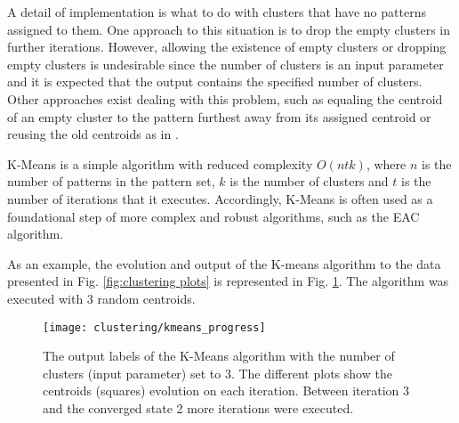 A detail of implementation is what to do with clusters that have no patterns assigned to them.
One approach to this situation is to drop the empty clusters in further iterations.
However, allowing the existence of empty clusters or dropping empty clusters is undesirable since the number of clusters is an input parameter and it is expected that the output contains the specified number of clusters.
Other approaches exist dealing with this problem, such as equaling the centroid of an empty cluster to the pattern furthest away from its assigned centroid or reusing the old centroids as in \cite{Pakhira2009}.

K-Means is a simple algorithm with reduced complexity $O(ntk)$, where $n$ is the number of patterns in the pattern set, $k$ is the number of clusters and $t$ is the number of iterations that it executes.
Accordingly, K-Means is often used as a foundational step of more complex and robust algorithms, such as the EAC algorithm.




As an example, the evolution and output of the K-means algorithm to the data presented in Fig. \ref{fig:clustering plots} is represented in Fig. \ref{fig:intro kmeans}.
The algorithm was executed with 3 random centroids.

\begin{figure}[hbtp]
    \centering
    \texttt{[image: clustering/kmeans\_progress]}
    \caption{The output labels of the K-Means algorithm with the number of clusters (input parameter) set to 3. The different plots show the centroids (squares) evolution on each iteration. Between iteration 3 and the converged state 2 more iterations were executed.}
    \label{fig:intro kmeans}
\end{figure}

